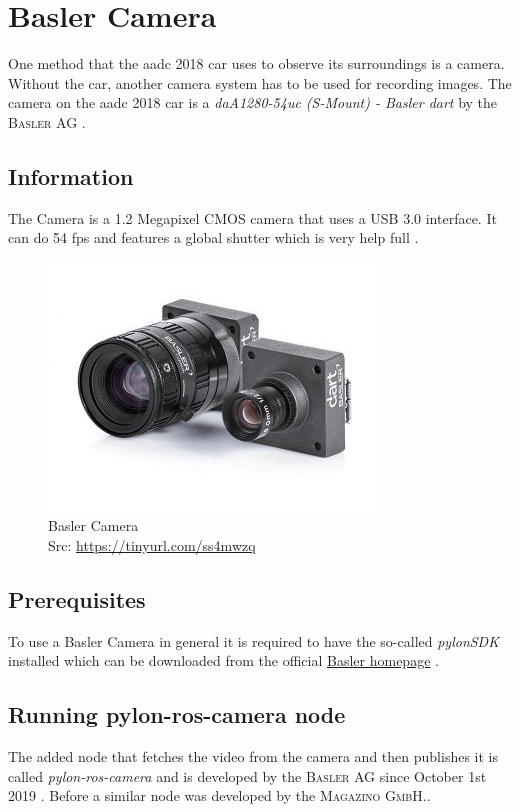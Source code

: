 
\chapter{Basler Camera\authorA}\label{ref:baslercamera}
One method that the \gls{aadc} 2018 car uses to observe its surroundings is a camera. Without the car, another camera system has to be used for recording images. The camera on the \gls{aadc} 2018 car is a \textit{daA1280-54uc (S-Mount) - Basler dart} by the \textsc{Basler AG} \cite{daA12854uc}.

\section{Information}
The Camera is a 1.2 Megapixel CMOS camera that uses a USB 3.0 interface. It can do 54 \gls{fps} and features a global shutter which is very help full \cite{baslerCamera}.
\begin{figure}[h]
	\centering
	\includegraphics[height=0.3\textwidth]{./media/images/Basler-Camera.jpg}
  	\caption{Basler Camera
  	\\Src: \url{https://tinyurl.com/ss4mwzq}}
  	\label{orbslamkittidataset}
\end{figure}

\section{Prerequisites}
To use a Basler Camera in general it is required to have the so-called \textit{pylonSDK} installed which can be downloaded from the official \href{https://www.baslerweb.com/de/vertrieb-support/downloads/downloads-software/}{Basler homepage} \cite{pylonsdkdownloadpage}.

\section{Running pylon-ros-camera node}
The added node that fetches the video from the camera and then publishes it is called \textit{pylon-ros-camera} and is developed by the \textsc{Basler AG} since October 1st 2019 \cite{pylonroscamera}. Before a similar node was developed by the \textsc{Magazino GmbH}.\cite{pyloncamera}.

